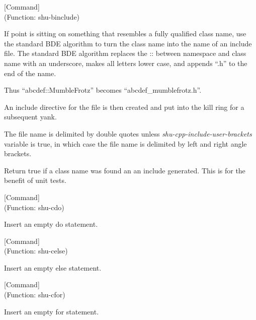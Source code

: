 \vspace{1em}
\noindent
{}
\usebox{\funcname}
 \hfill [Command]\\%
 (Function: shu-binclude)

\begin{doc-string}
If point is sitting on something that resembles a fully qualified class name,
use the standard BDE algorithm to turn the class name into the name of an
include file.  The standard BDE algorithm replaces the :: between namespace and
class name with an underscore, makes all letters lower case, and appends ``.h''
to the end of the name.

Thus ``abcdef::MumbleFrotz'' becomes ``abcdef\_mumblefrotz.h''.

An include directive for the file is then created and put into the kill ring for
a subsequent yank.

The file name is delimited by double quotes unless \emph{shu-cpp-include-user-brackets}
variable is true, in which case the file name is delimited by left and right
angle brackets.

Return true if a class name was found an an include generated.  This is for the
benefit of unit tests.
\end{doc-string}

\vspace{1em}
\noindent
{}
\usebox{\funcname}
 \hfill [Command]\\%
 (Function: shu-cdo)

\begin{doc-string}
Insert an empty do statement.
\end{doc-string}

\vspace{1em}
\noindent
{}
\usebox{\funcname}
 \hfill [Command]\\%
 (Function: shu-celse)

\begin{doc-string}
Insert an empty else statement.
\end{doc-string}

\vspace{1em}
\noindent
{}
\usebox{\funcname}
 \hfill [Command]\\%
 (Function: shu-cfor)

\begin{doc-string}
Insert an empty for statement.
\end{doc-string}

